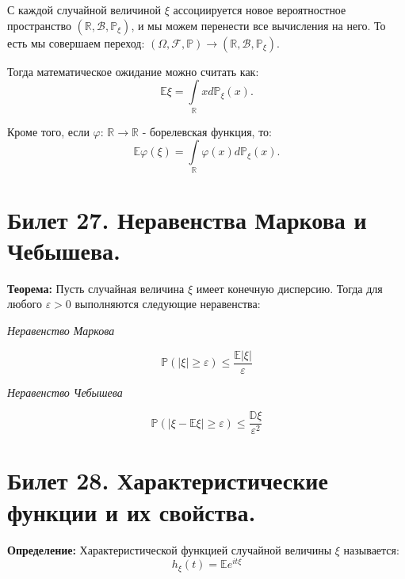 С каждой случайной величиной $\xi$ ассоциируется новое вероятностное пространство $(\mathbb{R} , \mathscr{B} , \mathbb{P_{\xi}})$, и мы можем перенести все вычисления на него. То есть мы совершаем переход: $(\Omega , \mathscr{F} , \mathbb{P}) \rightarrow (\mathbb{R} , \mathscr{B} , \mathbb{P_{\xi}})$.

Тогда математическое ожидание можно считать как:
\begin{equation*}
	\mathbb{E}\xi = \int\limits_{\mathbb{R}}x d\mathbb{P_{\xi}}(x).
\end{equation*}


Кроме того, если $\varphi$: $\mathbb{R} \rightarrow \mathbb{R}$ - борелевская функция, то:
\begin{equation*}
	\mathbb{E}\varphi(\xi) = \int\limits_{\mathbb{R}}\varphi (x) d\mathbb{P_{\xi}}(x).
\end{equation*}

\section{Билет 27. Неравенства Маркова и Чебышева.}

\hspace{\parindent}\textbf{Теорема:} Пусть случайная величина $\xi$ имеет конечную дисперсию. Тогда для любого $\varepsilon > 0$ выполняются следующие неравенства:

\begin{center}
	\it{Неравенство Маркова}
\end{center}
\begin{equation*}
	\mathbb{P}(|\xi| \geqslant \varepsilon) \leqslant \frac{\mathbb{E}|\xi|}{\varepsilon}
\end{equation*}

\begin{center}
	\it{Неравенство Чебышева}
\end{center}
\begin{equation*}
	\mathbb{P}(|\xi - \mathbb{E}\xi| \geqslant \varepsilon) \leqslant \frac{\mathbb{D}\xi}{\varepsilon^2}
\end{equation*}

\section{Билет 28. Характеристические функции и их свойства.}

\hspace{\parindent}\textbf{Определение:} Характеристической функцией случайной величины $\xi$ называется:
	\[
	h_\xi(t) = \mathbb{E}e^{it\xi}
	\]
	

